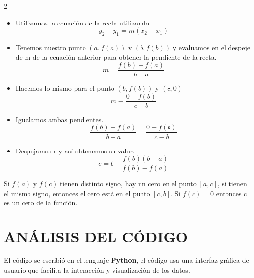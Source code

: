 \documentclass{rmf-d}
\begin{document}
\begin{multicols}{2}
\begin{itemize}
    \item Utilizamos la ecuación de la recta utilizando
    \begin{equation}
        y_2-y_1=m(x_2-x_1)
    \end{equation}
    \item Tenemos nuestro punto $(a,f(a))$ y $(b,f(b))$ y evaluamos en el despeje de m de la ecuación anterior para obtener la pendiente de la recta.
\begin{equation}
    m=\frac{f(b)-f(a)}{b-a}
\end{equation}
    \item Hacemos lo mismo para el punto $(b,f(b))$ y $(c,0)$
    \begin{equation}
        m=\frac{0-f(b)}{c-b}
    \end{equation}
    \item Igualamos ambas pendientes.
    \begin{equation}
        \frac{f(b)-f(a)}{b-a}=\frac{0-f(b)}{c-b}
    \end{equation}
    \item Despejamos c y así obtenemos su valor.
    \begin{equation}
        c=b-\frac{f(b)(b-a)}{f(b)-f(a)}
    \end{equation}
\end{itemize}

Si $f(a)$ y $f(c)$ tienen distinto signo, hay un cero en el punto $[a,c]$, si tienen el mismo signo, entonces el cero está en el punto $[c,b]$. Si $f(c)=0$ entonces c es un cero de la función.


































\section{ANÁLISIS DEL CÓDIGO}
\label{sec:3}
El código se escribió en el lenguaje \textbf{Python}, el código usa una interfaz gráfica de usuario que facilita la interacción y visualización de los datos.


\end{multicols}
\end{document}
